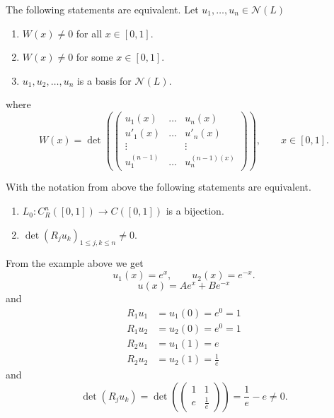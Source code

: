 \begin{theorem}
	The following statements are equivalent. Let $u_1,\dots,u_n \in \mathcal{N}(L)$
	\begin{enumerate}
		\item $W(x) \neq 0$ for all $x \in [0,1]$. 
		\item $W(x)\neq  0$ for some $x \in [0,1]$.
		\item $u_1,u_2, \dots,u_n$ is a basis for $\mathcal{N}(L)$.
	\end{enumerate}
	where 
	\[
		W(x) = \det \left( \begin{pmatrix}
			u_1(x) & \dots & u_n(x) \\
			u'_1(x) & \dots & u'_n(x) \\
			\vdots & & \vdots \\
			u_1^{(n-1)} & \dots & u_n^{(n-1)(x)}
		\end{pmatrix} \right), \qquad x \in [0,1].
	\]
\end{theorem}
\begin{theorem}
	With the notation from above the following statements are equivalent.
	\begin{enumerate}
		\item $L_0 : C^n_R( [0,1]) \to C([0,1])$ is a bijection.
		\item $\det(R_ju_k)_{1 \leq j,k \leq n} \neq 0$.
	\end{enumerate}
\end{theorem}

\begin{beispiel}[continue]
	From the example above we get
	\[
		u_1(x) = e^x, \qquad u_2(x) = e^{-x}.
	\]
	\[
		u(x) = A e^x + B e^{-x}
	\]
	and
	\begin{align*}
		R_1u_1 &= u_1(0)=e^0 =1 \\
		R_1u_2 &= u_2(0)=e^0 =1 \\
		R_2u_1 &= u_1(1)=e \\
		R_2u_2 &= u_2(1)=\frac{1}{e}
	\end{align*}
	and 
	\[
		\det(R_ju_k) = \det( \begin{pmatrix}
			1 & 1 \\ e & \frac{1}{e} 
		\end{pmatrix}) = \frac{1}{e} - e \neq 0.
	\]
\end{beispiel}

